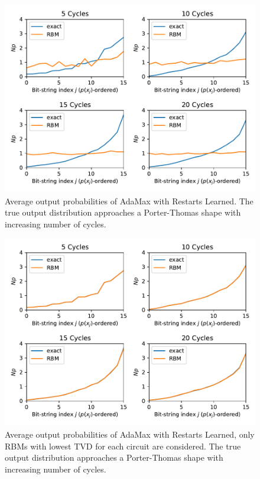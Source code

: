 \begin{figure}[H]
  \centering
  \includegraphics[width=\textwidth]{figures/results/AM-restarts-learned/avgPDF.pdf}
  \caption[Average output probabilities of AdaMax with Restarts Learned]{
    Average output probabilities of AdaMax with Restarts Learned. The true 
    output distribution approaches a Porter-Thomas shape with increasing number of cycles.}
  \label{fig:sr_tvd}
\end{figure}

\begin{figure}[H]
  \centering
  \includegraphics[width=\textwidth]{figures/results/AM-restarts-learned/avgBestPDF.pdf}
  \caption[Averaged best performing output probabilities of AdaMax with Restarts Learned]{
    Average output probabilities of AdaMax with Restarts Learned, only RBMs with lowest
    TVD for each circuit are considered. The true 
    output distribution approaches a Porter-Thomas shape with increasing number of cycles.}
  \label{fig:sr_tvd}
\end{figure}

